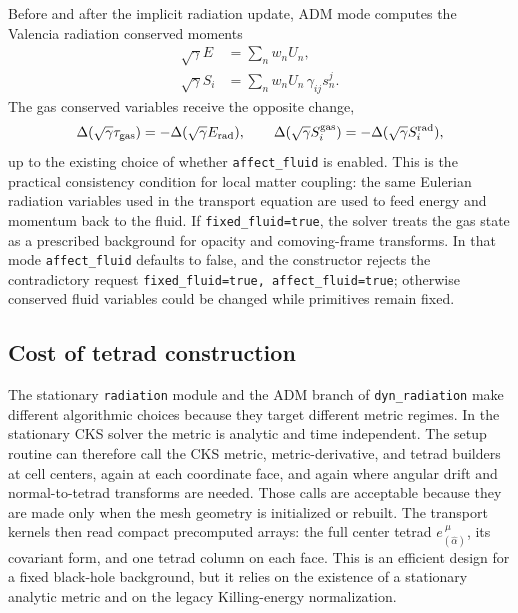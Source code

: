 \documentclass[11pt]{article}
\newcommand{\code}[1]{\texttt{#1}}
\begin{document}
Before and after the implicit radiation update, ADM mode computes the
Valencia radiation conserved moments
\begin{align}
  \sqrt{\gamma}E &= \sum_n w_n U_n,\\
  \sqrt{\gamma}S_i
    &= \sum_n w_n U_n\,\gamma_{ij}s^j_n .
  \label{eq:adm_feedback_moments}
\end{align}
The gas conserved variables receive the opposite change,
\begin{equation}
  \Delta(\sqrt{\gamma}\tau_{\rm gas}) =
    -\Delta(\sqrt{\gamma}E_{\rm rad}),\qquad
  \Delta(\sqrt{\gamma}S^{\rm gas}_i) =
    -\Delta(\sqrt{\gamma}S^{\rm rad}_i),
  \label{eq:gas_feedback}
\end{equation}
up to the existing choice of whether \code{affect\_fluid} is enabled.  This is
the practical consistency condition for local matter coupling: the same
Eulerian radiation variables used in the transport equation are used to feed
energy and momentum back to the fluid.  If \code{fixed\_fluid=true}, the solver
treats the gas state as a prescribed background for opacity and comoving-frame
transforms.  In that mode \code{affect\_fluid} defaults to false, and the
constructor rejects the contradictory request
\code{fixed\_fluid=true, affect\_fluid=true}; otherwise conserved fluid
variables could be changed while primitives remain fixed.

\subsection{Cost of tetrad construction}

The stationary \code{radiation} module and the ADM branch of
\code{dyn\_radiation} make different algorithmic choices because they target
different metric regimes.  In the stationary CKS solver the metric is analytic
and time independent.  The setup routine can therefore call the CKS metric,
metric-derivative, and tetrad builders at cell centers, again at each coordinate
face, and again where angular drift and normal-to-tetrad transforms are needed.
Those calls are acceptable because they are made only when the mesh geometry is
initialized or rebuilt.  The transport kernels then read compact precomputed
arrays: the full center tetrad \(e_{(\hat\alpha)}^{\ \mu}\), its covariant form,
and one tetrad column on each face.  This is an efficient design for a fixed
black-hole background, but it relies on the existence of a stationary analytic
metric and on the legacy Killing-energy normalization.
\end{document}
